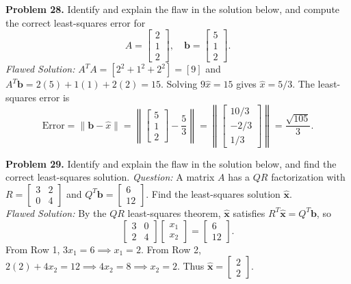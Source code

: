 \documentclass[11pt, letterpaper]{article}
\theoremstyle{definition}
\theoremstyle{remark}
\begin{document}
\textbf{Problem 28.} Identify and explain the flaw in the solution below, and compute the correct least-squares error for
\[
A = \begin{bmatrix} 2 \\ 1 \\ 2 \end{bmatrix}, \quad \mathbf{b} = \begin{bmatrix} 5 \\ 1 \\ 2 \end{bmatrix}.
\]
\textit{Flawed Solution:} $A^T A = [2^2 + 1^2 + 2^2] = [9]$ and $A^T \mathbf{b} = 2(5) + 1(1) + 2(2) = 15$. Solving $9\hat{x} = 15$ gives $\hat{x} = 5/3$. The least-squares error is
\[
\text{Error} = \|\mathbf{b} - \hat{x}\| = \left\| \begin{bmatrix} 5 \\ 1 \\ 2 \end{bmatrix} - \frac{5}{3} \right\| = \left\| \begin{bmatrix} 10/3 \\ -2/3 \\ 1/3 \end{bmatrix} \right\| = \frac{\sqrt{105}}{3}.
\]

\textbf{Problem 29.} Identify and explain the flaw in the solution below, and find the correct least-squares solution.
\textit{Question:} A matrix $A$ has a $QR$ factorization with $R = \begin{bmatrix} 3 & 2 \\ 0 & 4 \end{bmatrix}$ and $Q^T \mathbf{b} = \begin{bmatrix} 6 \\ 12 \end{bmatrix}$. Find the least-squares solution $\hat{\mathbf{x}}$.\\
\textit{Flawed Solution:} By the $QR$ least-squares theorem, $\hat{\mathbf{x}}$ satisfies $R^T \hat{\mathbf{x}} = Q^T \mathbf{b}$, so
\[
\begin{bmatrix} 3 & 0 \\ 2 & 4 \end{bmatrix} \begin{bmatrix} x_1 \\ x_2 \end{bmatrix} = \begin{bmatrix} 6 \\ 12 \end{bmatrix}.
\]
From Row 1, $3x_1 = 6 \implies x_1 = 2$. From Row 2, $2(2) + 4x_2 = 12 \implies 4x_2 = 8 \implies x_2 = 2$. Thus $\hat{\mathbf{x}} = \begin{bmatrix} 2 \\ 2 \end{bmatrix}$.
\end{document}
